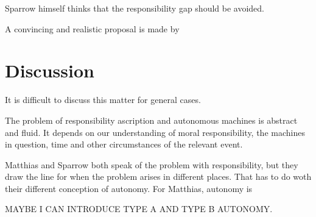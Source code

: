 \documentclass{article}
\begin{document}
\newpage
Sparrow himself thinks that the responsibility gap should be avoided.

A convincing and realistic proposal is made by 

\section{Discussion}

It is difficult to discuss this matter for general cases.

The problem of responsibility ascription and autonomous machines is abstract and
fluid. It depends on our understanding of moral responsibility, the machines in
question, time and other circumstances of the relevant event.

Matthias and Sparrow both speak of the problem with responsibility, but they
draw the line for when the problem arises in different places. That has to do
woth their different conception of autonomy. For Matthias, autonomy is

MAYBE I CAN INTRODUCE TYPE A AND TYPE B AUTONOMY.
\end{document}
